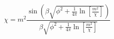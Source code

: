 \begin{equation}
\chi=
m^2
\frac {\sin \left( \beta \sqrt{\phi^2+ \frac{1}{4 \pi}
\ln[\frac{m^2}{\chi}]} \right)}{\beta \sqrt{
\phi^2 +\frac{1}{4
\pi}
\ln[\frac{m^2}{\chi}]}}
\end{equation}

